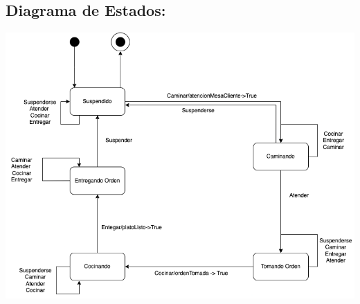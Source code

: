\documentclass{article}
\begin{document}
\subsection*{Diagrama de Estados:}
\begin{center}
  \includegraphics[scale=0.40]{./Practica02DiagramaDeEstados.png}
\end{center}
\end{document}
